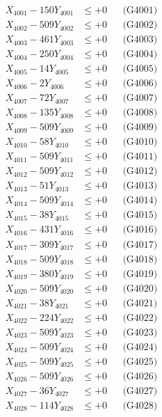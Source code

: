 \documentclass[a4paper,10pt]{article}
\begin{document}
{\begin{align}
\allowbreak
X_{4001} - 150Y_{4001} &\leq +0 && \text{(G4001)} \\
X_{4002} - 509Y_{4002} &\leq +0 && \text{(G4002)} \\
X_{4003} - 461Y_{4003} &\leq +0 && \text{(G4003)} \\
X_{4004} - 250Y_{4004} &\leq +0 && \text{(G4004)} \\
X_{4005} - 14Y_{4005} &\leq +0 && \text{(G4005)} \\
X_{4006} - 2Y_{4006} &\leq +0 && \text{(G4006)} \\
X_{4007} - 72Y_{4007} &\leq +0 && \text{(G4007)} \\
X_{4008} - 135Y_{4008} &\leq +0 && \text{(G4008)} \\
X_{4009} - 509Y_{4009} &\leq +0 && \text{(G4009)} \\
X_{4010} - 58Y_{4010} &\leq +0 && \text{(G4010)} \\
\allowbreak
X_{4011} - 509Y_{4011} &\leq +0 && \text{(G4011)} \\
X_{4012} - 509Y_{4012} &\leq +0 && \text{(G4012)} \\
X_{4013} - 51Y_{4013} &\leq +0 && \text{(G4013)} \\
X_{4014} - 509Y_{4014} &\leq +0 && \text{(G4014)} \\
X_{4015} - 38Y_{4015} &\leq +0 && \text{(G4015)} \\
X_{4016} - 431Y_{4016} &\leq +0 && \text{(G4016)} \\
X_{4017} - 309Y_{4017} &\leq +0 && \text{(G4017)} \\
X_{4018} - 509Y_{4018} &\leq +0 && \text{(G4018)} \\
X_{4019} - 380Y_{4019} &\leq +0 && \text{(G4019)} \\
X_{4020} - 509Y_{4020} &\leq +0 && \text{(G4020)} \\
\allowbreak
X_{4021} - 38Y_{4021} &\leq +0 && \text{(G4021)} \\
X_{4022} - 224Y_{4022} &\leq +0 && \text{(G4022)} \\
X_{4023} - 509Y_{4023} &\leq +0 && \text{(G4023)} \\
X_{4024} - 509Y_{4024} &\leq +0 && \text{(G4024)} \\
X_{4025} - 509Y_{4025} &\leq +0 && \text{(G4025)} \\
X_{4026} - 509Y_{4026} &\leq +0 && \text{(G4026)} \\
X_{4027} - 36Y_{4027} &\leq +0 && \text{(G4027)} \\
X_{4028} - 114Y_{4028} &\leq +0 && \text{(G4028)} \\

\end{align}}
\end{document}
